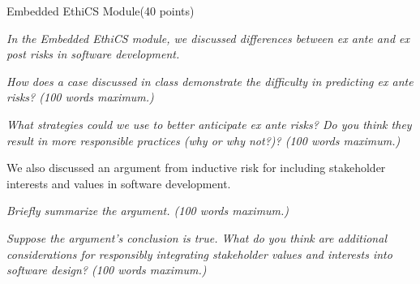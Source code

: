\documentclass{article}
\begin{document}
\newpage
\begin{question}{Embedded EthiCS Module}{(40 points)}
  \begin{subquestion}
    \textit{In the Embedded EthiCS module, we discussed differences between \textit{ex ante} and \textit{ex post} risks in software development.}


    \begin{subsubquestion}
      \textit{How does a case discussed in class demonstrate the difficulty in predicting \textit{ex ante} risks? (100 words maximum.)}


      
    \end{subsubquestion}

    \begin{subsubquestion}
      \textit{What strategies could we use to better anticipate \textit{ex ante} risks? Do you think they result in more responsible practices (why or why not?)? (100 words maximum.)}


    \end{subsubquestion}

  \end{subquestion}

  \begin{subquestion}
    We also discussed an argument from inductive risk for including stakeholder interests and values in software development.
    \begin{subsubquestion}
      \textit{Briefly summarize the argument. (100 words maximum.)}
      
    \end{subsubquestion}

    \begin{subsubquestion}
      \textit{Suppose the argument’s conclusion is true. What do you think are additional considerations for responsibly integrating stakeholder values and interests into software design? (100 words maximum.)}
      
    \end{subsubquestion}

 \end{subquestion}

\end{question}
\end{document}
